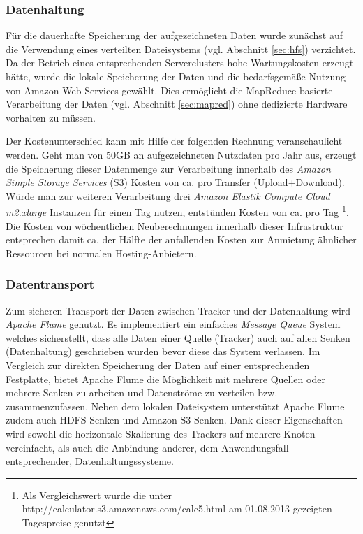\subsubsection{Datenhaltung} Für die dauerhafte Speicherung der aufgezeichneten Daten wurde zunächst auf die Verwendung eines verteilten Dateisystems (vgl. Abschnitt \ref{sec:hfs}) verzichtet. Da der Betrieb eines entsprechenden Serverclusters hohe Wartungskosten erzeugt hätte, wurde die lokale Speicherung der Daten und die bedarfsgemäße Nutzung von Amazon Web Services gewählt. Dies ermöglicht die MapReduce-basierte Verarbeitung der Daten (vgl. Abschnitt \ref{sec:mapred}) ohne dedizierte Hardware vorhalten zu müssen.

Der Kostenunterschied kann mit Hilfe der folgenden Rechnung veranschaulicht werden. Geht man von 50GB an aufgezeichneten Nutzdaten pro Jahr aus, erzeugt die Speicherung dieser Datenmenge zur Verarbeitung innerhalb des \textit{Amazon Simple Storage Services} (S3) Kosten von ca.  pro Transfer (Upload+Download). Würde man zur weiteren Verarbeitung drei \textit{Amazon Elastik Compute Cloud} \textit{m2.xlarge} Instanzen für einen Tag nutzen, entstünden Kosten von ca.  pro Tag \footnote{Als Vergleichswert wurde die unter http://calculator.s3.amazonaws.com/calc5.html am 01.08.2013 gezeigten Tagespreise genutzt}. Die Kosten von wöchentlichen Neuberechnungen innerhalb dieser Infrastruktur entsprechen damit ca. der Hälfte der anfallenden Kosten zur Anmietung ähnlicher Ressourcen bei normalen Hosting-Anbietern.

\subsubsection{Datentransport} \label{sec:datatransp} Zum sicheren Transport der Daten zwischen Tracker und der Datenhaltung wird \textit{Apache Flume} genutzt. Es implementiert ein einfaches \textit{Message Queue} System welches sicherstellt, dass alle Daten einer Quelle (Tracker) auch auf allen Senken (Datenhaltung) geschrieben wurden bevor diese das System verlassen. Im Vergleich zur direkten Speicherung der Daten auf einer entsprechenden Festplatte, bietet Apache Flume die Möglichkeit mit mehrere Quellen oder mehrere Senken zu arbeiten und Datenströme zu verteilen bzw. zusammenzufassen. Neben dem lokalen Dateisystem unterstützt Apache Flume zudem auch HDFS-Senken und Amazon S3-Senken. Dank dieser Eigenschaften wird sowohl die horizontale Skalierung des Trackers auf mehrere Knoten vereinfacht, als auch die Anbindung anderer, dem Anwendungsfall entsprechender, Datenhaltungssysteme.

